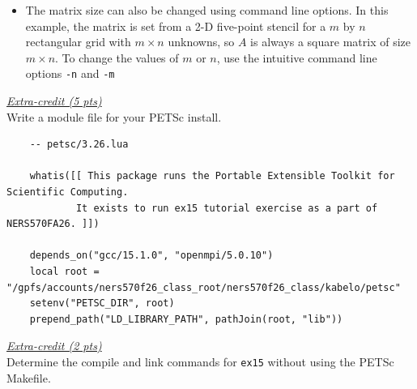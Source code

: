 \documentclass[letterpaper]{article}
\begin{document}
\begin{enumerate}
\begin{itemize}
            For more information, see PETSc’s documentation (see the section on \href{https://petsc.org/release/manual/ksp/#}{Krylov Solvers}) for this assignment (\url{https://petsc.org/release/docs/manual}).
            Try to use \lstinline{-log_view} and interpret the output information to help understand the meaning of the options provided.

        \item The matrix size can also be changed using command line options.
            In this example, the matrix is set from a 2-D five-point stencil for a $m$ by $n$ rectangular grid with $m \times n$ unknowns, so $A$ is always a square matrix of size $m \times n$.
            To change the values of $m$ or $n$, use the intuitive command line options \lstinline{-n} and \lstinline{-m}
    \end{itemize}
\end{enumerate}


\underline{\textit{Extra-credit (5 pts)}}\\
Write a module file for your PETSc install. \\

\begin{lstlisting}
    -- petsc/3.26.lua

    whatis([[ This package runs the Portable Extensible Toolkit for Scientific Computing.
            It exists to run ex15 tutorial exercise as a part of NERS570FA26. ]])

    depends_on("gcc/15.1.0", "openmpi/5.0.10")
    local root = "/gpfs/accounts/ners570f26_class_root/ners570f26_class/kabelo/petsc"
    setenv("PETSC_DIR", root)
    prepend_path("LD_LIBRARY_PATH", pathJoin(root, "lib"))
\end{lstlisting}

\underline{\textit{Extra-credit (2 pts)}}\\
Determine the compile and link commands for \lstinline{ex15} without using the PETSc Makefile.
\end{document}
